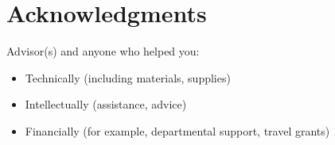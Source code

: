 \chapter{Acknowledgments}
Advisor(s) and anyone who helped you:
\begin{itemize}
  \item Technically (including materials, supplies)
  \item Intellectually (assistance, advice)
  \item Financially (for example, departmental support, travel grants)
\end{itemize}